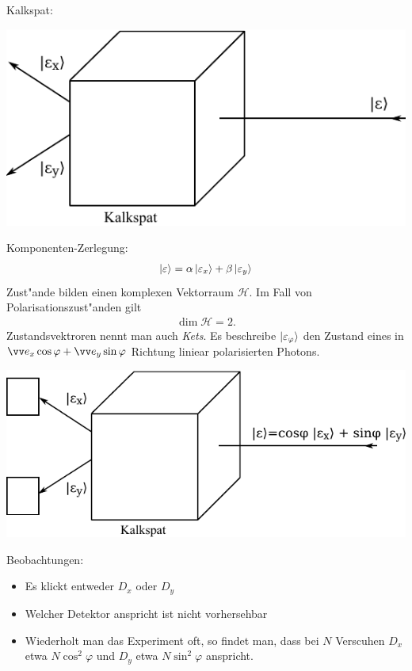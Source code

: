 \documentclass[a4paper]{scrartcl}
\begin{document}
{Kalkspat:
\begin{center}
\includegraphics{003Kalkspat2}
\end{center}
Komponenten-Zerlegung:
\begin{align}
\Ket{ \varepsilon } = \alpha \Ket{ \varepsilon_x } + \beta \Ket{ \varepsilon_y}
\end{align}
Zust"ande bilden einen komplexen Vektorraum $\mathcal H$. Im Fall von Polarisationszust"anden gilt 
\begin{align}
\dim \mathcal{H} = 2.
\end{align}Zustandsvektroren nennt man auch \emph{Kets}. Es beschreibe $\Ket{ \varepsilon_\varphi }$ den Zustand eines in $\vv e_x \cos \varphi + \vv e_y \sin \varphi$ Richtung liniear polarisierten Photons.
\begin{center}
\includegraphics{004Kalkspat}
\end{center}
Beobachtungen:
\begin{itemize}
\item Es klickt entweder $D_x$ oder $D_y$
\item Welcher Detektor anspricht ist nicht vorhersehbar
\item Wiederholt man das Experiment oft, so findet man, dass bei $N$ Verscuhen $D_x$ etwa $N \cos^2 \varphi$ und $D_y$ etwa $N \sin^2\varphi$ anspricht.
\end{itemize}
}
\end{document}
